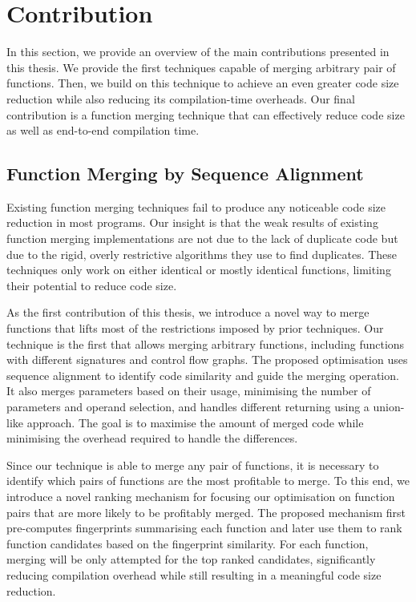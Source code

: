 \section{Contribution}

In this section, we provide an overview of the main contributions presented in this thesis.
We provide the first techniques capable of merging arbitrary pair of functions.
Then, we build on this technique to achieve an even greater code size reduction while also reducing its compilation-time overheads.
Our final contribution is a function merging technique that can effectively reduce code size as well as end-to-end compilation time.

\subsection{Function Merging by Sequence Alignment}


Existing function merging techniques fail to produce any noticeable code size reduction in most programs.
Our insight is that the weak results of existing function merging implementations are not due to the lack of duplicate code but due to the rigid, overly restrictive algorithms they use to find duplicates.
These techniques only work on either identical or mostly identical functions, limiting their potential to reduce code size.

As the first contribution of this thesis, we introduce a novel way to merge functions that lifts most of the restrictions imposed by prior techniques.
Our technique is the first that allows merging arbitrary functions, including functions with different signatures and control flow graphs.
The proposed optimisation uses sequence alignment to identify code similarity and guide the merging operation.
It also merges parameters based on their usage, minimising the number of parameters and operand selection, and handles different returning using a union-like approach.
The goal is to maximise the amount of merged code while minimising the overhead required to handle the differences.

Since our technique is able to merge any pair of functions, it is necessary to identify which pairs of functions are the most profitable to merge.
To this end, we introduce a novel ranking mechanism for focusing our optimisation on function pairs that are more likely to be profitably merged.
The proposed mechanism first pre-computes fingerprints summarising each function and later use them to rank function candidates based on the fingerprint similarity.
For each function, merging will be only attempted for the top ranked candidates, significantly reducing compilation overhead while still resulting in a meaningful code size reduction.

